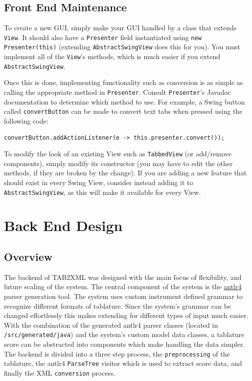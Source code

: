 \documentclass[11pt]{article}
\begin{document}
\subsection{Front End Maintenance}
\label{sec:org8e9b7c9}
To create a new GUI, simply make your GUI handled by a class that extends \texttt{View}.  It should also have a \texttt{Presenter} field instantiated using \texttt{new Presenter(this)} (extending \texttt{AbstractSwingView} does this for you).  You must implement all of the \texttt{View}'s methods, which is much easier if you extend \texttt{AbstractSwingView}.

Once this is done, implementing functionality such as conversion is as simple as calling the appropriate method in \texttt{Presenter}.  Consult \texttt{Presenter}'s Javadoc documentation to determine which method to use.  For example, a Swing button called \texttt{convertButton} can be made to convert text tabs when pressed using the following code:
\begin{verbatim}
convertButton.addActionListener(e -> this.presenter.convert());
\end{verbatim}

To modify the look of an existing View such as \texttt{TabbedView} (or add/remove components), simply modify its constructor (you may have to edit the other methods, if they are broken by the change).  If you are adding a new feature that should exist in every Swing View, consider instead adding it to \texttt{AbstractSwingView}, as this will make it available for every View.

\newpage

\section{Back End Design}
\label{sec:orgdea5705}
\subsection{Overview}
\label{sec:org95cf646}
The backend of TAB2XML was designed with the main focus of flexibility, and future scaling of the system. The central component of the system is the \href{https://www.antlr.org/}{antlr4} parser generation tool. The system uses custom instrument defined grammar to recognize different formats of tablature. Since the system's grammar can be changed effortlessly this makes extending for different types of input much easier. With the combination of the generated antlr4 parser classes (located in \texttt{/src/generated/java}) and the system's custom model data classes, a tablature score can be abstracted into components which make handling the data simpler. The backend is divided into a three step process, the \texttt{preprocessing} of the tablature, the antlr4 \texttt{ParseTree} visitor which is used to extract score data, and finally the XML \texttt{conversion} process.
\end{document}
